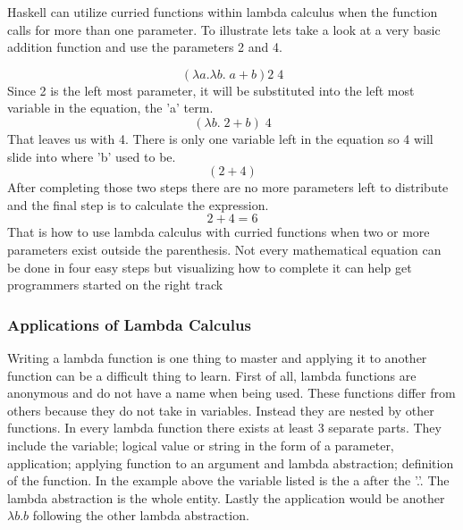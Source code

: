 \documentclass{article}
\begin{document}
    Haskell can utilize curried functions within lambda calculus when the function calls for more than one parameter. To illustrate lets take a look at a very basic addition function and use the parameters 2 and 4.
    
    $$(\lambda a. \lambda b. \;a + b)2\; 4$$
   Since 2 is the left most parameter, it will be substituted into the left most variable in the equation, the 'a' term.
   $$(\lambda b. \;2 + b)\; 4$$
   That leaves us with 4. There is only one variable left in the equation so 4 will slide into where 'b' used to be.
   $$(2 + 4)$$
   After completing those two steps there are no more parameters left to distribute and the final step is to calculate the expression.
   $$2 + 4 = 6$$
   That is how to use lambda calculus with curried functions when two or more parameters exist outside the parenthesis. Not every mathematical equation can be done in four easy steps but visualizing how to complete it can help get programmers started on the right track
    
        \subsubsection{Applications of Lambda Calculus}
        Writing a lambda function is one thing to master and applying it to another function can be a difficult thing to learn. First of all, lambda functions are anonymous and do not have a name when being used. These functions differ from others because they do not take in variables. Instead they are nested by other functions. In every lambda function there exists at least 3 separate parts. They include the variable; logical value or string in the form of a parameter, application; applying function to an argument and lambda abstraction; definition of the function. In the example above the variable listed is the a after the '.'. The lambda abstraction is the whole entity. Lastly the application would be another $\lambda b.b$ following the other lambda abstraction. 
        
        
        
\end{document}
